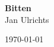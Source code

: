 \begin{titlepage}
    \centering
    \vspace*{2cm}

    {\Huge\textbf{Bitten}}\\[1.5cm]
    
    {\Large Jan Ulrichts}\\[0.5cm]
    
    \vfill
    
    {\Large \today}
    
    \vspace*{1cm}
\end{titlepage}